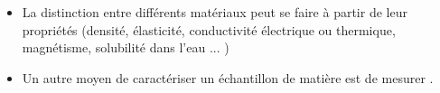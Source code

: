 \documentclass[xcolor={dvipsnames}]{beamer}
\begin{document}
\begin{frame}


\begin{block}{}
	\begin{itemize}
		\item La distinction entre différents matériaux peut se faire à partir de leur propriétés (densité, élasticité, conductivité électrique ou thermique, magnétisme, solubilité dans l'eau ...  )
		
		\item Un autre moyen de caractériser un échantillon de matière est de mesurer . 
	\end{itemize}
	
		
\end{block}

\end{frame}
\end{document}
